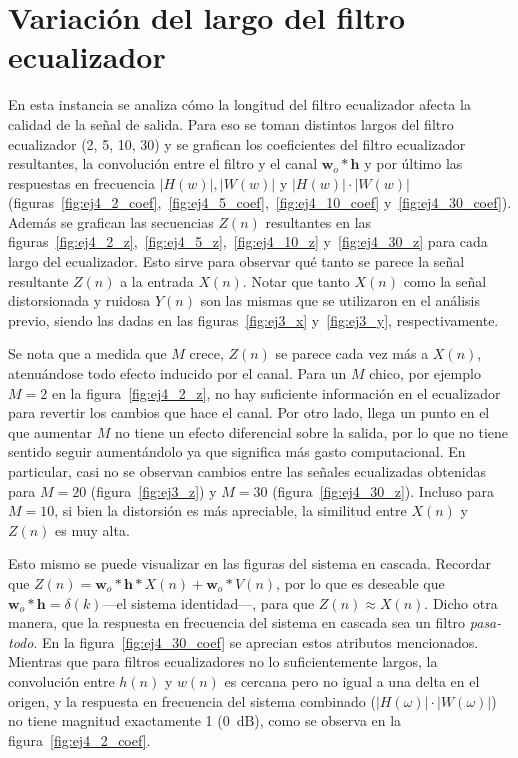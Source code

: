 \clearpage
\section{Variación del largo del filtro ecualizador}

En esta instancia se analiza cómo la longitud del filtro ecualizador afecta la calidad de la señal de salida. Para eso se toman distintos largos del filtro ecualizador (2, 5, 10, 30) y se grafican los coeficientes del filtro ecualizador resultantes, la convolución entre el filtro y el canal $\mathbf{w}_o * \mathbf{h}$ y por último las respuestas en frecuencia $|H(w)|, |W(w)|$ y $|H(w)| \cdot |W(w)|$ (figuras~\ref{fig:ej4_2_coef},~\ref{fig:ej4_5_coef},~\ref{fig:ej4_10_coef} y~\ref{fig:ej4_30_coef}). Además se grafican las secuencias $Z(n)$ resultantes en las figuras~\ref{fig:ej4_2_z},~\ref{fig:ej4_5_z},~\ref{fig:ej4_10_z} y~\ref{fig:ej4_30_z} para cada largo del ecualizador. Esto sirve para observar qué tanto se parece la señal resultante $Z(n)$ a la entrada $X(n)$. Notar que tanto $X(n)$ como la señal distorsionada y ruidosa $Y(n)$ son las mismas que se utilizaron en el análisis previo, siendo las dadas en las figuras~\ref{fig:ej3_x} y~\ref{fig:ej3_y}, respectivamente.

Se nota que a medida que $M$ crece, $Z(n)$ se parece cada vez más a $X(n)$, atenuándose todo efecto inducido por el canal. Para un $M$ chico, por ejemplo $M = 2$ en la figura~\ref{fig:ej4_2_z}, no hay suficiente información en el ecualizador para revertir los cambios que hace el canal. Por otro lado, llega un punto en el que aumentar $M$ no tiene un efecto diferencial sobre la salida, por lo que no tiene sentido seguir aumentándolo ya que significa más gasto computacional. En particular, casi no se observan cambios entre las señales ecualizadas obtenidas para $M = 20$ (figura~\ref{fig:ej3_z}) y $M = 30$ (figura~\ref{fig:ej4_30_z}). Incluso para $M = 10$, si bien la distorsión es más apreciable, la similitud entre $X(n)$ y $Z(n)$ es muy alta.

Esto mismo se puede visualizar en las figuras del sistema en cascada. Recordar que $Z(n) = \mathbf{w}_o * \mathbf{h} * X(n) + \mathbf{w}_o * V(n)$, por lo que es deseable que $\mathbf{w}_o * \mathbf{h} = \delta(k)$---el sistema identidad---, para que $Z(n) \approx X(n)$. Dicho otra manera, que la respuesta en frecuencia del sistema en cascada sea un filtro \emph{pasa-todo}. En la figura~\ref{fig:ej4_30_coef} se aprecian estos atributos mencionados. Mientras que para filtros ecualizadores no lo suficientemente largos, la convolución entre $h(n)$ y $w(n)$ es cercana pero no igual a una delta en el origen, y la respuesta en frecuencia del sistema combinado ($|H(\omega)| \cdot |W(\omega)|$) no tiene magnitud exactamente 1 (\qty{0}{\dB}), como se observa en la figura~\ref{fig:ej4_2_coef}.

